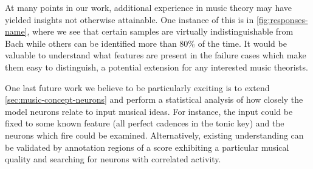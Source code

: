 At many points in our work, additional experience in music theory may have
yielded insights not otherwise attainable. One instance of this is in
\vref{fig:responses-name}, where we see that certain samples are virtually
indistinguishable from Bach while others can be identified more than $80\%$ of
the time. It would be valuable to understand what features are present in the
failure cases which make them easy to distinguish, a potential extension for
any interested music theorists.

One last future work we believe to be particularly exciting is to extend
\vref{sec:music-concept-neurons} and perform a statistical analysis of how
closely the model neurons relate to input musical ideas. For instance, the
input could be fixed to some known feature (\eg all perfect cadences in the
tonic key) and the neurons which fire could be examined. Alternatively,
existing understanding can be validated by annotation regions of a score
exhibiting a particular musical quality and searching for neurons with
correlated activity.

